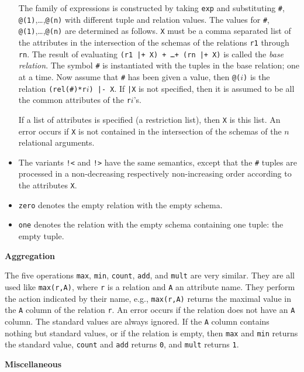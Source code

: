 \documentclass[a4,14pt,latin1]{article}
\begin{document}
\begin{itemize}
The family of expressions is constructed by taking {\tt exp} and substituting
{\tt \#}, {\tt @(1)},\ldots,{\tt @(n)} with different tuple and relation
values.
The values for {\tt \#}, {\tt @(1)},\ldots,{\tt @(n)} are determined as
follows. {\tt X} must be a comma separated list of the attributes in the
intersection of the schemas of the relations {\tt r1} through {\tt rn}.
The result of evaluating {\tt (r1 |+ X) + \ldots + (rn |+ X)}
is called the {\em base relation}. The symbol {\tt \#} is instantiated
with the tuples in the base relation; one at a time. Now assume that
{\tt \#} has been given a value, then {\tt @($i$)} is the relation
{\tt (rel(\#)*r$i$) |- X}. If \verb"|X" is not specified, then it is
assumed to be all the common attributes of the {\tt r$i$}'s.

If a list of attributes is specified (a restriction list), then
{\tt X} is this list. An error occurs if {\tt X} is not contained in the
intersection of the schemas of the $n$ relational arguments.
\item
The variants \verb"!<" and \verb"!>" have the same semantics, except that
the {\tt \#} tuples are processed in a non-decreasing respectively
non-increasing order according to the attributes \verb"X".
\item
{\tt zero} denotes the empty relation with the empty schema.
\item
{\tt one} denotes the relation with the empty schema containing one tuple:
the empty tuple.
\end{itemize}

\vspace{2ex}
{\bf Aggregation}

The five operations {\tt max}, {\tt min}, {\tt count}, {\tt add}, and
{\tt mult} are very similar. They are all used like
{\tt max(r,A)}, where {\tt r} is a relation and {\tt A} an attribute name.
They perform the action indicated by their name, e.g., {\tt max(r,A)} returns
the maximal value in the {\tt A} column of the relation {\tt r}. An error
occurs if the relation does not have an {\tt A} column. The standard values
are always ignored. If the {\tt A} column contains nothing but standard values,
or if the relation is empty,
then {\tt max} and {\tt min} returns the standard value, {\tt count} and
{\tt add} returns {\tt 0}, and {\tt mult} returns {\tt 1}.

\vspace{2ex}
{\bf Miscellaneous}
\end{document}
